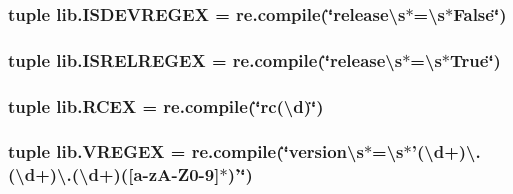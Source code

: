 \subsubsection[{I\+S\+D\+E\+V\+R\+E\+G\+E\+X}]{\setlength{\rightskip}{0pt plus 5cm}tuple lib.\+I\+S\+D\+E\+V\+R\+E\+G\+E\+X = re.\+compile(\char`\"{}release\textbackslash{}s$\ast$=\textbackslash{}{\bf s}$\ast${\bf False}\char`\"{})}\label{namespacelib_ad1b6fc30ae38674bf21b2cbb2c2db25b}
\hypertarget{namespacelib_a1ebdd670633bcea771e3c27bfac0623a}{}
\subsubsection[{I\+S\+R\+E\+L\+R\+E\+G\+E\+X}]{\setlength{\rightskip}{0pt plus 5cm}tuple lib.\+I\+S\+R\+E\+L\+R\+E\+G\+E\+X = re.\+compile(\char`\"{}release\textbackslash{}s$\ast$=\textbackslash{}{\bf s}$\ast${\bf True}\char`\"{})}\label{namespacelib_a1ebdd670633bcea771e3c27bfac0623a}
\hypertarget{namespacelib_a3b631e15e3971a05778799b2e97ca0a8}{}
\subsubsection[{R\+C\+E\+X}]{\setlength{\rightskip}{0pt plus 5cm}tuple lib.\+R\+C\+E\+X = re.\+compile(\char`\"{}rc(\textbackslash{}d)\char`\"{})}\label{namespacelib_a3b631e15e3971a05778799b2e97ca0a8}
\hypertarget{namespacelib_a2c71642ed6dc1f3731c2a25f5b143a14}{}
\subsubsection[{V\+R\+E\+G\+E\+X}]{\setlength{\rightskip}{0pt plus 5cm}tuple lib.\+V\+R\+E\+G\+E\+X = re.\+compile(\char`\"{}version\textbackslash{}s$\ast$=\textbackslash{}{\bf s}$\ast$'(\textbackslash{}d+)\textbackslash{}.(\textbackslash{}d+)\textbackslash{}.(\textbackslash{}d+)(\mbox{[}{\bf a}-\/z\+A-\/Z0-\/9\mbox{]}$\ast$)'\char`\"{})}\label{namespacelib_a2c71642ed6dc1f3731c2a25f5b143a14}
